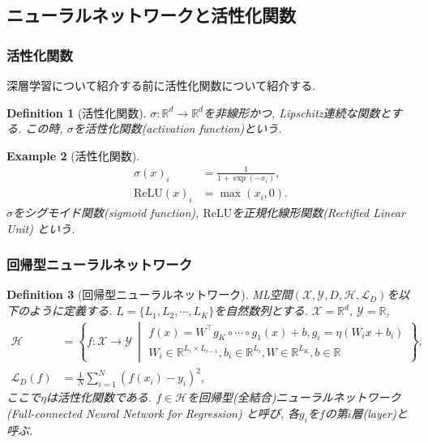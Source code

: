 \documentclass[dvipdfmx,11pt]{beamer}		%
\newtheorem{defi}{Definition}
\newtheorem{exam}[defi]{Example}
\newcommand{\R}{\mathbb{R}}
\newcommand{\X}{\mathcal{X}}
\newcommand{\Y}{\mathcal{Y}}
\newcommand{\Hil}{\mathcal{H}}
\newcommand{\Loss}{\mathcal{L}_{D}}
\newcommand{\MLsp}{(\X, \Y, D, \Hil, \Loss)}
\begin{document}
    \subsection{ニューラルネットワークと活性化関数}
    \begin{frame}
        \frametitle{活性化関数}
        深層学習について紹介する前に活性化関数について紹介する. 
        \begin{defi}[活性化関数]
            $\sigma:\R^{d}\to\R^{d}$を非線形かつ, Lipschitz連続な関数とする. 
            この時, $\sigma$を活性化関数(activation function)という.
        \end{defi}  
        \begin{exam}[活性化関数]
            \begin{align*}
                \sigma(x)_{i} &= \frac{1}{1 + \exp(-x_{i})},\\
                \text{ReLU}(x)_{i} &= \max(x_{i}, 0).
            \end{align*}
            $\sigma$をシグモイド関数(sigmoid function), $\text{ReLU}$を正規化線形関数(Rectified Linear Unit)
            という.
        \end{exam}
    \end{frame}
    \begin{frame}
        \frametitle{回帰型ニューラルネットワーク}
        \begin{defi}[回帰型ニューラルネットワーク]
            ML空間$\MLsp$を以下のように定義する. $L = \{L_{1}, L_{2}, \cdots, L_{K}\}$を自然数列とする.
            $\X = \R^d$, $\Y = \R$, 
            \footnotesize
            \begin{align*}
                \Hil &= \left\{f:\X\to\Y~\middle|
                \begin{array}{l}
                    f(x) = W^{\top}g_{K}\circ\cdots\circ g_{1}(x) + b, g_{i} = \eta(W_{i}x + b_{i})\\
                    W_{i}\in\R^{L_{i}\times L_{i - 1}}, b_{i}\in\R^{L_{i}}, W\in\R^{L_{K}}, b\in\R
                \end{array}
                \right\},\\
                \Loss(f) &= \frac{1}{N}\sum_{i = 1}^{N}(f(x_i) - y_i)^2,
            \end{align*}
            \normalsize
            ここで$\eta$は活性化関数である. $f\in\Hil$を回帰型(全結合)ニューラルネットワーク(Full-connected Neural Network for Regression)
            と呼び, 各$g_{i}$を$f$の第$i$層(layer)と呼ぶ.
        \end{defi}
    \end{frame}
\end{document}
